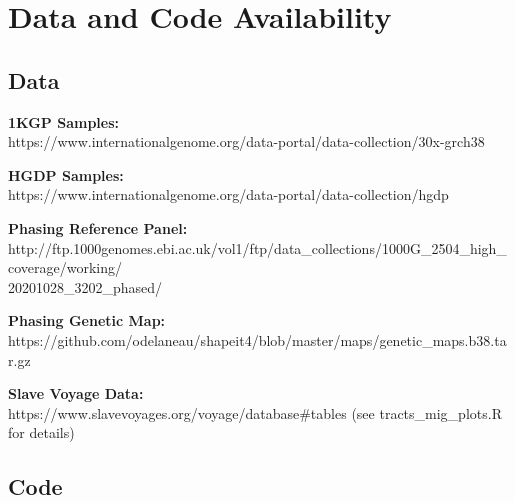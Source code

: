 \documentclass[11pt]{article}
\begin{document}
\vspace{8mm}
\section{Data and Code Availability}

\subsection{Data}

\textbf{1KGP Samples:} \\
https://www.internationalgenome.org/data-portal/data-collection/30x-grch38
\vspace{3mm}

\noindent
\textbf{HGDP Samples:} \\
https://www.internationalgenome.org/data-portal/data-collection/hgdp
\vspace{3mm}

\noindent
\textbf{Phasing Reference Panel:} \\
http://ftp.1000genomes.ebi.ac.uk/vol1/ftp/data\_collections/1000G\_2504\_high\_coverage/working/\\20201028\_3202\_phased/
\vspace{3mm}

\noindent
\textbf{Phasing Genetic Map:} \\
https://github.com/odelaneau/shapeit4/blob/master/maps/genetic\_maps.b38.tar.gz
\vspace{3mm}

\noindent
\textbf{Slave Voyage Data:} \\
https://www.slavevoyages.org/voyage/database\#tables (see tracts\_mig\_plots.R for details)


\subsection{Code}
\end{document}
